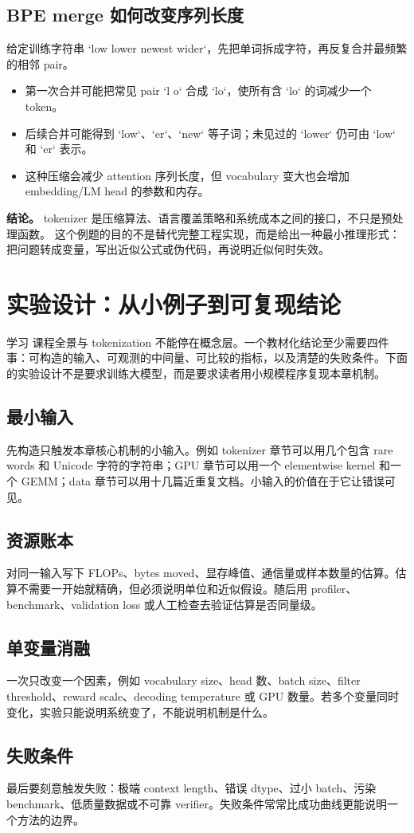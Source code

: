 \documentclass[a4paper]{article}
\begin{document}
\subsection{BPE merge 如何改变序列长度}
给定训练字符串 `low lower newest wider`，先把单词拆成字符，再反复合并最频繁的相邻 pair。
\begin{itemize}
\item 第一次合并可能把常见 pair `l o` 合成 `lo`，使所有含 `lo` 的词减少一个 token。
\item 后续合并可能得到 `low`、`er`、`new` 等子词；未见过的 `lower` 仍可由 `low` 和 `er` 表示。
\item 这种压缩会减少 attention 序列长度，但 vocabulary 变大也会增加 embedding/LM head 的参数和内存。
\end{itemize}
\textbf{结论。} tokenizer 是压缩算法、语言覆盖策略和系统成本之间的接口，不只是预处理函数。
这个例题的目的不是替代完整工程实现，而是给出一种最小推理形式：把问题转成变量，写出近似公式或伪代码，再说明近似何时失效。
\section{实验设计：从小例子到可复现结论}
学习 课程全景与 tokenization 不能停在概念层。一个教材化结论至少需要四件事：可构造的输入、可观测的中间量、可比较的指标，以及清楚的失败条件。下面的实验设计不是要求训练大模型，而是要求读者用小规模程序复现本章机制。
\subsection{最小输入}
先构造只触发本章核心机制的小输入。例如 tokenizer 章节可以用几个包含 rare words 和 Unicode 字符的字符串；GPU 章节可以用一个 elementwise kernel 和一个 GEMM；data 章节可以用十几篇近重复文档。小输入的价值在于它让错误可见。
\subsection{资源账本}
对同一输入写下 FLOPs、bytes moved、显存峰值、通信量或样本数量的估算。估算不需要一开始就精确，但必须说明单位和近似假设。随后用 profiler、benchmark、validation loss 或人工检查去验证估算是否同量级。
\subsection{单变量消融}
一次只改变一个因素，例如 vocabulary size、head 数、batch size、filter threshold、reward scale、decoding temperature 或 GPU 数量。若多个变量同时变化，实验只能说明系统变了，不能说明机制是什么。
\subsection{失败条件}
最后要刻意触发失败：极端 context length、错误 dtype、过小 batch、污染 benchmark、低质量数据或不可靠 verifier。失败条件常常比成功曲线更能说明一个方法的边界。
\end{document}
